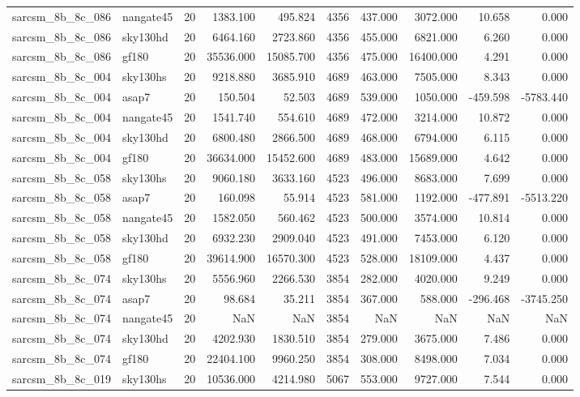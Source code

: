 \documentclass{article}
\begin{document}
\begin{longtable}{llrrrrrrrr}
sarcsm\_8b\_8c\_086 & nangate45 & 20 & 1383.100 & 495.824 & 4356 & 437.000 & 3072.000 & 10.658 & 0.000 \\
sarcsm\_8b\_8c\_086 & sky130hd & 20 & 6464.160 & 2723.860 & 4356 & 455.000 & 6821.000 & 6.260 & 0.000 \\
sarcsm\_8b\_8c\_086 & gf180 & 20 & 35536.000 & 15085.700 & 4356 & 475.000 & 16400.000 & 4.291 & 0.000 \\
sarcsm\_8b\_8c\_004 & sky130hs & 20 & 9218.880 & 3685.910 & 4689 & 463.000 & 7505.000 & 8.343 & 0.000 \\
sarcsm\_8b\_8c\_004 & asap7 & 20 & 150.504 & 52.503 & 4689 & 539.000 & 1050.000 & -459.598 & -5783.440 \\
sarcsm\_8b\_8c\_004 & nangate45 & 20 & 1541.740 & 554.610 & 4689 & 472.000 & 3214.000 & 10.872 & 0.000 \\
sarcsm\_8b\_8c\_004 & sky130hd & 20 & 6800.480 & 2866.500 & 4689 & 468.000 & 6794.000 & 6.115 & 0.000 \\
sarcsm\_8b\_8c\_004 & gf180 & 20 & 36634.000 & 15452.600 & 4689 & 483.000 & 15689.000 & 4.642 & 0.000 \\
sarcsm\_8b\_8c\_058 & sky130hs & 20 & 9060.180 & 3633.160 & 4523 & 496.000 & 8683.000 & 7.699 & 0.000 \\
sarcsm\_8b\_8c\_058 & asap7 & 20 & 160.098 & 55.914 & 4523 & 581.000 & 1192.000 & -477.891 & -5513.220 \\
sarcsm\_8b\_8c\_058 & nangate45 & 20 & 1582.050 & 560.462 & 4523 & 500.000 & 3574.000 & 10.814 & 0.000 \\
sarcsm\_8b\_8c\_058 & sky130hd & 20 & 6932.230 & 2909.040 & 4523 & 491.000 & 7453.000 & 6.120 & 0.000 \\
sarcsm\_8b\_8c\_058 & gf180 & 20 & 39614.900 & 16570.300 & 4523 & 528.000 & 18109.000 & 4.437 & 0.000 \\
sarcsm\_8b\_8c\_074 & sky130hs & 20 & 5556.960 & 2266.530 & 3854 & 282.000 & 4020.000 & 9.249 & 0.000 \\
sarcsm\_8b\_8c\_074 & asap7 & 20 & 98.684 & 35.211 & 3854 & 367.000 & 588.000 & -296.468 & -3745.250 \\
sarcsm\_8b\_8c\_074 & nangate45 & 20 & NaN & NaN & 3854 & NaN & NaN & NaN & NaN \\
sarcsm\_8b\_8c\_074 & sky130hd & 20 & 4202.930 & 1830.510 & 3854 & 279.000 & 3675.000 & 7.486 & 0.000 \\
sarcsm\_8b\_8c\_074 & gf180 & 20 & 22404.100 & 9960.250 & 3854 & 308.000 & 8498.000 & 7.034 & 0.000 \\
sarcsm\_8b\_8c\_019 & sky130hs & 20 & 10536.000 & 4214.980 & 5067 & 553.000 & 9727.000 & 7.544 & 0.000 \\

\end{longtable}
\end{document}
